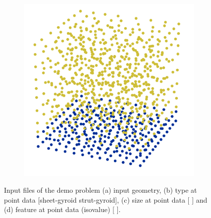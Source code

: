 \begin{figure}[htb]
\begin{subfigure}[t]{.225\textwidth}
		\caption{}\label{fig:size_dp}
	\end{subfigure}\hspace{1.0em}%
	\begin{subfigure}[t]{.225\textwidth}
		\centering
		\includegraphics[width=\linewidth]{figures/cube_feature_dp.png}
		\caption{}\label{fig:feature_dp}
	\end{subfigure}%

	\caption{Input files of the demo problem (a) input geometry, (b) type at point data [\mycirc[myColorD] sheet-gyroid \mycirc[myColorA] strut-gyroid], (c) size at point data [ ] and (d) feature at point data (isovalue) [ ].}
	\label{fig:demo}
\end{figure}

